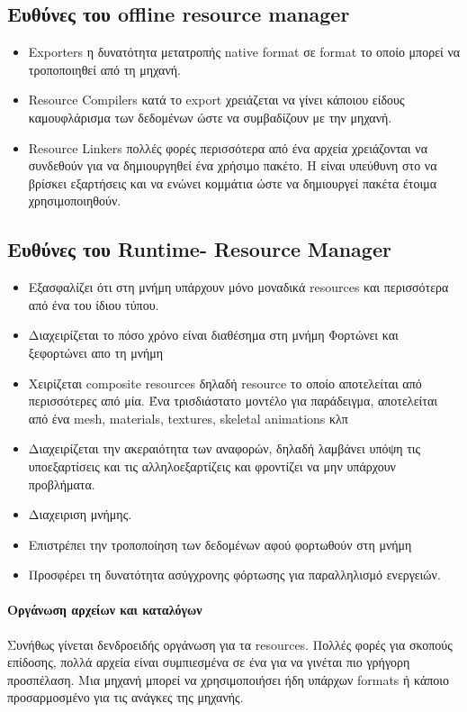 \subsection{Ευθύνες του offline resource manager}
\begin{itemize}
\item Exporters η δυνατότητα μετατροπής native format σε format το οποίο μπορεί να τροποποιηθεί από τη μηχανή.
\item Resource Compilers κατά το export χρειάζεται να γίνει κάποιου είδους καμουφλάρισμα των δεδομένων ώστε να συμβαδίζουν με την μηχανή.
\item Resource Linkers πολλές φορές περισσότερα από ένα αρχεία χρειάζονται να συνδεθούν για να δημιουργηθεί ένα χρήσιμο πακέτο. Η είναι υπεύθυνη στο να βρίσκει εξαρτήσεις και να ενώνει κομμάτια ώστε να δημιουργεί πακέτα έτοιμα χρησιμοποιηθούν.
\end{itemize}

\subsection{Ευθύνες του Runtime- Resource Manager}
\begin{itemize}
\item Εξασφαλίζει ότι στη μνήμη υπάρχουν μόνο μοναδικά resources και περισσότερα από ένα του ίδιου τύπου.
\item Διαχειρίζεται το πόσο χρόνο είναι διαθέσημα στη μνήμη
Φορτώνει και ξεφορτώνει απο τη μνήμη
\item Χειρίζεται composite resources δηλαδή resource το οποίο αποτελείται από περισσότερες από μία. Ένα τρισδιάστατο μοντέλο για παράδειγμα, αποτελείται από ένα mesh, materials, textures, skeletal animations κλπ
\item Διαχειρίζεται την ακεραιότητα των αναφορών, δηλαδή λαμβάνει υπόψη τις υποεξαρτίσεις και τις αλληλοεξαρτίζεις και φροντίζει να μην υπάρχουν προβλήματα.
\item Διαχειριση μνήμης.
\item Επιστρέπει την τροποποίηση των δεδομένων αφού φορτωθούν στη μνήμη
\item Προσφέρει τη δυνατότητα ασύγχρονης φόρτωσης για παραλληλισμό ενεργειών.
\end{itemize}

\paragraph{Οργάνωση αρχείων και καταλόγων}
Συνήθως γίνεται δενδροειδής οργάνωση για τα resources.  Πολλές φορές για σκοπούς επίδοσης, πολλά αρχεία είναι συμπιεσμένα σε ένα για να γινέται πιο γρήγορη προσπέλαση. Μια μηχανή μπορεί να χρησιμοποιήσει ήδη υπάρχων formats ή κάποιο προσαρμοσμένο για τις ανάγκες της μηχανής. 

